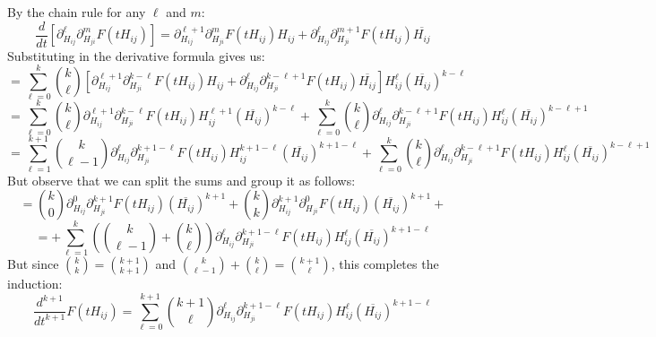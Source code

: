 \documentclass[11pt]{article}
\begin{document}
\noindent By the chain rule for any $\ell$ and $m$:
$$\frac{d}{dt}\left[\partial_{H_{ij}}^\ell \partial_{H_{ji}}^m F(tH_{ij})\right] = \partial_{H_{ij}}^{\ell+1} \partial_{H_{ji}}^m F(tH_{ij})H_{ij} + \partial_{H_{ij}}^\ell \partial_{H_{ji}}^{m+1} F(tH_{ij})\overline{H_{ij}}$$
Substituting in the derivative formula gives us:
$$
= \sum_{\ell=0}^k \binom{k}{\ell}\left[\partial_{H_{ij}}^{\ell+1} \partial_{H_{ji}}^{k-\ell} F(tH_{ij})H_{ij} + \partial_{H_{ij}}^\ell \partial_{H_{ji}}^{k-\ell+1} F(tH_{ij})\overline{H_{ij}}\right]H_{ij}^\ell \left(\overline{H_{ij}}\right)^{k-\ell}$$
$$
= \sum_{\ell=0}^k \binom{k}{\ell}\partial_{H_{ij}}^{\ell+1} \partial_{H_{ji}}^{k-\ell} F(tH_{ij})H_{ij}^{\ell+1} \left(\overline{H_{ij}}\right)^{k-\ell} + \sum_{\ell=0}^k \binom{k}{\ell}\partial_{H_{ij}}^\ell \partial_{H_{ji}}^{k-\ell+1} F(tH_{ij})H_{ij}^\ell \left(\overline{H_{ij}}\right)^{k-\ell+1}
$$
$$
= \sum_{\ell=1}^{k+1} \binom{k}{\ell-1}\partial_{H_{ij}}^{\ell} \partial_{H_{ji}}^{k+1-\ell} F(tH_{ij})H_{ij}^{k+1-\ell} \left(\overline{H_{ij}}\right)^{k+1-\ell} + \sum_{\ell=0}^k \binom{k}{\ell}\partial_{H_{ij}}^\ell \partial_{H_{ji}}^{k-\ell+1} F(tH_{ij})H_{ij}^\ell \left(\overline{H_{ij}}\right)^{k-\ell+1}
$$
But observe that we can split the sums and group it as follows:
$$=\binom{k}{0}\partial_{H_{ij}}^0\partial_{H_{ji}}^{k+1} F(tH_{ij})\left(\overline{H_{ij}}\right)^{k+1}+\binom{k}{k}\partial_{H_{ij}}^{k+1}\partial_{H_{ji}}^{0} F(tH_{ij})\left(\overline{H_{ij}}\right)^{k+1}+$$
$$=+\sum_{\ell=1}^k \left(\binom{k}{\ell-1}+\binom{k}{\ell}\right)\partial_{H_{ij}}^{\ell} \partial_{H_{ji}}^{k+1-\ell} F(tH_{ij})H_{ij}^{\ell} \left(\overline{H_{ij}}\right)^{k+1-\ell} $$
But since $\binom{k}{k} = \binom{k+1}{k+1}$ and $\binom{k}{\ell-1}+\binom{k}{\ell} = \binom{k+1}{\ell}$, this completes the induction:
\begin{equation*}
\frac{d^{k+1}}{dt^{k+1}} F(tH_{ij}) = \sum_{\ell=0}^{k+1} \binom{k+1}{\ell}\partial_{H_{ij}}^\ell \partial_{H_{ji}}^{k+1-\ell} F(tH_{ij})H_{ij}^\ell \left(\overline{H_{ij}}\right)^{k+1-\ell}
\end{equation*}
\end{document}
